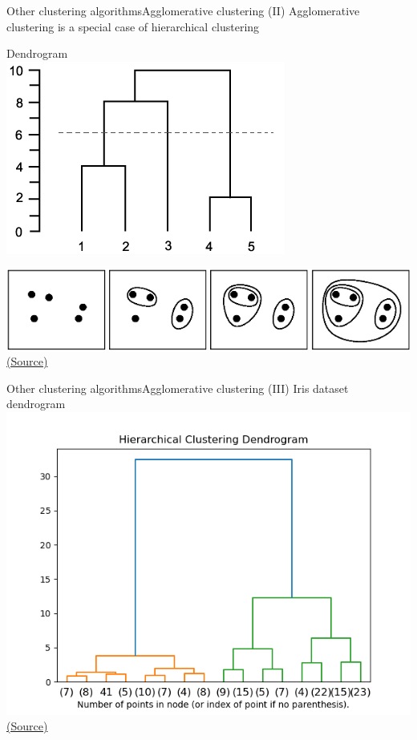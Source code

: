 \documentclass[10pt,compress]{beamer} %
\begin{document}
\begin{frame}{Other clustering algorithms}{Agglomerative clustering (II)}
    Agglomerative clustering is a special case of hierarchical clustering
    
    \bigskip

	\centering Dendrogram\\ \includegraphics[width=0.5\linewidth]{figs/dendrogram.png}

	\includegraphics[width=0.7\linewidth]{figs/agglomerative.png}\\
	\scriptsize\href{https://stackoverflow.com/questions/8016313/agglomerative-clustering-in-matlab}{(Source)}
\end{frame}

\begin{frame}{Other clustering algorithms}{Agglomerative clustering (III)}
	\centering Iris dataset dendrogram\\
    \includegraphics[width=0.6\linewidth]{figs/iris-dendrogram.png}\\
	\scriptsize\href{https://scikit-learn.org/stable/auto\_examples/cluster/plot\_agglomerative\_dendrogram.html\#sphx-glr-auto-examples-cluster-plot-agglomerative-dendrogram-py}{(Source)}
\end{frame}
\end{document}
